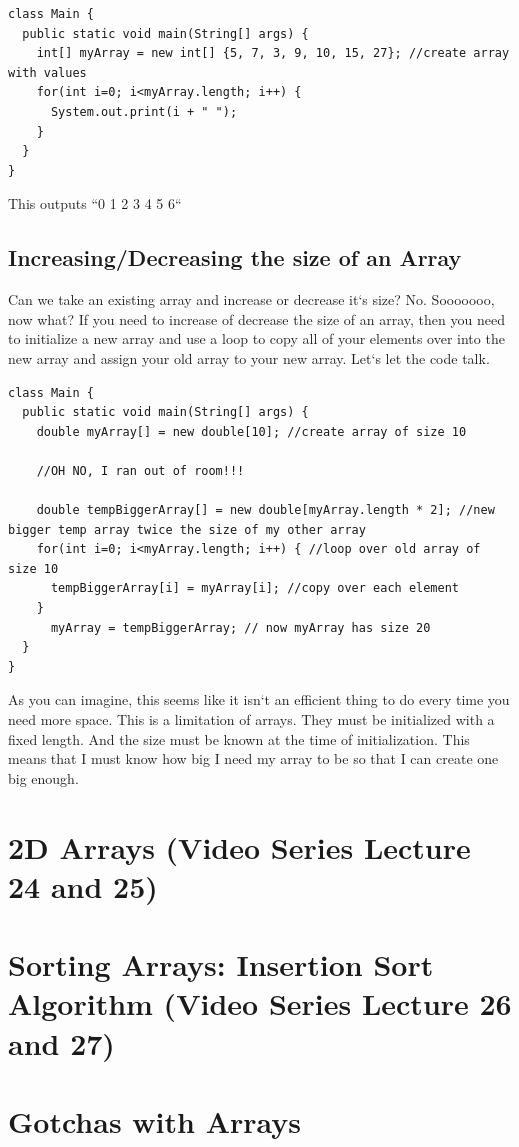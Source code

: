 \documentclass[11]{article}
\begin{document}
\begin{lstlisting}
class Main {
  public static void main(String[] args) {
    int[] myArray = new int[] {5, 7, 3, 9, 10, 15, 27}; //create array with values
    for(int i=0; i<myArray.length; i++) {
      System.out.print(i + " ");
    }
  }
}
\end{lstlisting}

This outputs ``0 1 2 3 4 5 6``
\subsection{Increasing/Decreasing the size of an Array}
Can we take an existing array and increase or decrease it`s size? No. Sooooooo, now what? If you need to increase of decrease the size of an array, then you need to initialize a new array and use a loop to copy all of your elements over into the new array and assign your old array to your new array. Let`s let the code talk.

\begin{lstlisting}
class Main {
  public static void main(String[] args) {
    double myArray[] = new double[10]; //create array of size 10

    //OH NO, I ran out of room!!!

    double tempBiggerArray[] = new double[myArray.length * 2]; //new bigger temp array twice the size of my other array
    for(int i=0; i<myArray.length; i++) { //loop over old array of size 10
      tempBiggerArray[i] = myArray[i]; //copy over each element
    }
      myArray = tempBiggerArray; // now myArray has size 20
  }
}
\end{lstlisting}

As you can imagine, this seems like it isn`t an efficient thing to do every time you need more space. This is a limitation of arrays. They must be initialized with a fixed length. And the size must be known at the time of initialization. This means that I must know how big I need my array to be so that I can create one big enough.
\section{2D Arrays (Video Series Lecture 24 and 25)}
\section{Sorting Arrays: Insertion Sort Algorithm (Video Series Lecture 26 and 27)}
\section{Gotchas with Arrays}
\label{sec:gotchas}
\end{document}
